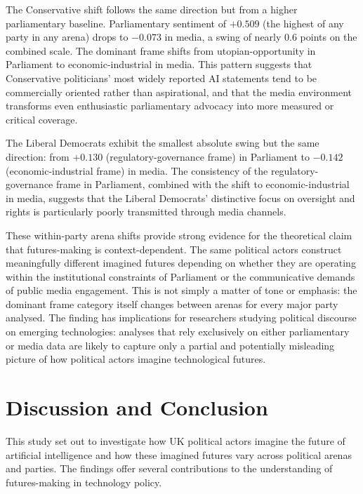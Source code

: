 The Conservative shift follows the same direction but from a higher parliamentary baseline. Parliamentary sentiment of $+0.509$ (the highest of any party in any arena) drops to $-0.073$ in media, a swing of nearly 0.6 points on the combined scale. The dominant frame shifts from utopian-opportunity in Parliament to economic-industrial in media. This pattern suggests that Conservative politicians' most widely reported AI statements tend to be commercially oriented rather than aspirational, and that the media environment transforms even enthusiastic parliamentary advocacy into more measured or critical coverage.

The Liberal Democrats exhibit the smallest absolute swing but the same direction: from $+0.130$ (regulatory-governance frame) in Parliament to $-0.142$ (economic-industrial frame) in media. The consistency of the regulatory-governance frame in Parliament, combined with the shift to economic-industrial in media, suggests that the Liberal Democrats' distinctive focus on oversight and rights is particularly poorly transmitted through media channels.

These within-party arena shifts provide strong evidence for the theoretical claim that futures-making is context-dependent. The same political actors construct meaningfully different imagined futures depending on whether they are operating within the institutional constraints of Parliament or the communicative demands of public media engagement. This is not simply a matter of tone or emphasis: the dominant frame category itself changes between arenas for every major party analysed. The finding has implications for researchers studying political discourse on emerging technologies: analyses that rely exclusively on either parliamentary or media data are likely to capture only a partial and potentially misleading picture of how political actors imagine technological futures.

\chapter{Discussion and Conclusion}

This study set out to investigate how UK political actors imagine the future of artificial intelligence and how these imagined futures vary across political arenas and parties. The findings offer several contributions to the understanding of futures-making in technology policy.

